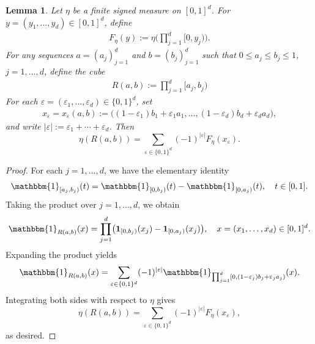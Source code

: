 \documentclass[11pt]{article}
\newtheorem{lemma}[thm]{Lemma}
\newcommand{\bone}{\mathbbm{1}}
\newcommand{\bs}[1]{\boldsymbol{#1}}
\begin{document}


\begin{lemma}\label{lem:InclusionExclusionBox}
Let $\eta$ be a finite signed measure on $[0,1]^d$. For $y=(y_1,\ldots,y_d)\in[0,1]^d$, define
\begin{align}
F_\eta(y):=\eta\biggl(\prod_{j=1}^d [0,y_j)\biggr). \label{eq:MeasureofCube}
\end{align}
For any sequences $a= (a_j)_{j = 1}^d$ and $b = (b_j)_{j = 1}^d$ such that $0\leq a_j\leq b_j\leq 1$, $j=1,\ldots,d$, define the cube
\begin{align}
R(a,b):=\prod_{j=1}^d [a_j,b_j) \label{eq:halfopencube}
\end{align}
For each $\varepsilon=(\varepsilon_1,\ldots,\varepsilon_d)\in\{0,1\}^d$, set
\begin{align}
x_\varepsilon=x_\varepsilon(a,b):=\bigl((1-\varepsilon_1)b_1+\varepsilon_1 a_1,\ldots,(1-\varepsilon_d)b_d+\varepsilon_d a_d\bigr), \label{eq:vertex}
\end{align}
and write $|\varepsilon|:=\varepsilon_1+\cdots+\varepsilon_d$. Then
\[
\eta(R(a,b))=\sum_{\varepsilon\in\{0,1\}^d}(-1)^{|\varepsilon|} F_\eta(x_\varepsilon).
\]
\end{lemma}

\begin{proof}
For each $j=1,\ldots,d$, we have the elementary identity
\[
\bone_{[a_j,b_j)}(t)=\bone_{[0,b_j)}(t)-\bone_{[0,a_j)}(t), \quad t\in[0,1].
\]
Taking the product over \(j=1,\ldots,d\), we obtain
\[
\bone_{R(a,b)}(x)=\prod_{j=1}^d \bigl(\mathbf{1}_{[0,b_j)}(x_j)-\mathbf{1}_{[0,a_j)}(x_j)\bigr), \quad x=(x_1,\ldots,x_d)\in[0,1]^d.
\]
Expanding the product yields
\[
\bone_{R(a,b)}(x) = \sum_{\varepsilon\in\{0,1\}^d} (-1)^{|\varepsilon|}
\bone_{\prod_{j=1}^d [0,(1-\varepsilon_j)b_j+\varepsilon_j a_j)}(x). 
\]
Integrating both sides with respect to $\eta$ gives
\[
\eta(R(a,b))=\sum_{\varepsilon\in\{0,1\}^d}(-1)^{|\varepsilon|} F_\eta(x_\varepsilon),
\]
as desired.
\end{proof}
\end{document}
